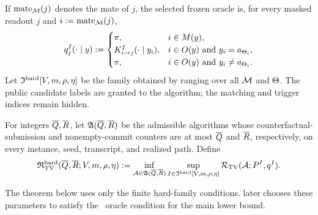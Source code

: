\begin{definition}
If $\MateInMatching{j}$ denotes the mate of $j$, the selected
frozen oracle is, for every masked readout $j$ and
$i:=\MateInMatching{j}$,
\begin{equation}
 \HardOracleRow{I}{y}{j}
 :=\begin{cases}
 \HardMarginal,
   &i\in\MaskSet{y},\\
 \HardKernel{i}{j}{I}(\cdot\mid y_i),
   &i\in\ObservedSet{y}\ \text{and}\
     y_i=\HardCandidate{\TriggerIndex{i}},\\
 \HardMarginal,
   &i\in\ObservedSet{y}\ \text{and}\
     y_i\ne\HardCandidate{\TriggerIndex{i}}.
 \end{cases}
 \label{app:eq:hard-oracle}
\end{equation}
Let
$\HardFamily[\HardVocabSize,\HardBankSize,\TriggerMass,\EdgeCoupling]$ be the
family obtained by ranging over all $\HiddenMatching$ and $\TriggerVector$.
The public candidate labels are granted to the algorithm;
the matching and trigger indices remain hidden.
\end{definition}

For integers $\QueryBudget{},\RoundBudget{}$, let $\HardAlgorithmClass{\QueryBudget{}}{\RoundBudget{}}$ be the admissible algorithms
whose counterfactual-submission and nonempty-commit counters are at most $\QueryBudget{}$
and $\RoundBudget{}$, respectively, on every instance, seed, transcript, and realized
path.  Define
\begin{equation}
 \HardMinimax(\QueryBudget{},\RoundBudget{};\HardVocabSize,\HardBankSize,
              \TriggerMass,\EdgeCoupling)
 :=\inf_{\mathcal A\in\HardAlgorithmClass{\QueryBudget{}}{\RoundBudget{}}}
   \sup_{I\in\HardFamily[\HardVocabSize,\HardBankSize,
                           \TriggerMass,\EdgeCoupling]}
   \SeedRisk(\mathcal A;\HardTargetLaw{I},\HardOracle{I}).
 \label{app:eq:hard-minimax-risk}
\end{equation}

The theorem below uses only the finite hard-family conditions.
 later chooses these parameters
to satisfy the \HellingerCase\ oracle condition for the main lower bound.

